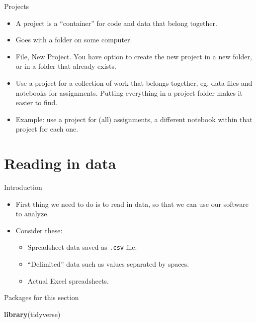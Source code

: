 \documentclass[ignorenonframetext,]{beamer}
\newenvironment{Shaded}{\begin{snugshade}}{\end{snugshade}}
\newcommand{\KeywordTok}[1]{\textcolor[rgb]{0.13,0.29,0.53}{\textbf{#1}}}
\newcommand{\NormalTok}[1]{#1}
\providecommand{\tightlist}{%
  \setlength{\itemsep}{0pt}\setlength{\parskip}{0pt}}
\begin{document}
\begin{frame}{Projects}
\protect\hypertarget{projects}{}

\begin{itemize}
\tightlist
\item
  A project is a ``container'' for code and data that belong together.
\item
  Goes with a folder on some computer.
\item
  File, New Project. You have option to create the new project in a new
  folder, or in a folder that already exists.
\item
  Use a project for a collection of work that belongs together, eg. data
  files and notebooks for assignments. Putting everything in a project
  folder makes it easier to find.
\item
  Example: use a project for (all) assignments, a different notebook
  within that project for each one.
\end{itemize}

\end{frame}

\hypertarget{reading-in-data}{%
\section{Reading in data}\label{reading-in-data}}

\begin{frame}[fragile]{Introduction}
\protect\hypertarget{introduction}{}

\begin{itemize}
\tightlist
\item
  First thing we need to do is to read in data, so that we can use our
  software to analyze.
\item
  Consider these:

  \begin{itemize}
  \tightlist
  \item
    Spreadsheet data saved as \texttt{.csv} file.
  \item
    ``Delimited'' data such as values separated by spaces.
  \item
    Actual Excel spreadsheets.
  \end{itemize}
\end{itemize}

\end{frame}

\begin{frame}[fragile]{Packages for this section}
\protect\hypertarget{packages-for-this-section}{}

\begin{Shaded}
\begin{Highlighting}[]
\KeywordTok{library}\NormalTok{(tidyverse)}
\end{Highlighting}
\end{Shaded}

\end{frame}
\end{document}
